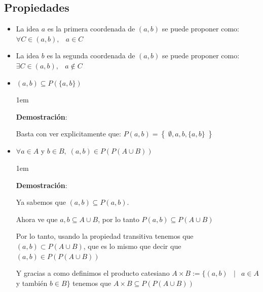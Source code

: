 \documentclass[12pt, fleqn]{report}                             %
\newenvironment{SmallIndentation}[1][0.75em]                    %
        {\begin{adjustwidth}{#1}{}\begin{footnotesize}}             %
        {\end{footnotesize}\end{adjustwidth}}                       %
\DeclareMathOperator \Space     {\quad}                         %
\DeclareMathOperator \MiniSpace {\;}                            %
\newcommand \Such           {\MiniSpace | \MiniSpace}           %
\theoremstyle{break}                                            %
\newcommand{\Set}[1]            {\left\{ \; #1 \; \right\}}     %
\begin{document}
                    \subsection*{Propiedades}
                    \begin{itemize}
                        \item La idea $a$ es la primera coordenada de $(a, b)$ se puede
                            proponer como: $\forall C \in (a, b), \MiniSpace a \in C$
                        
                        \item La idea $b$ es la segunda coordenada de $(a, b)$ se puede
                            proponer como: $\exists C \in (a, b), \MiniSpace a \notin C$
                        
                        \item $(a,b) \subseteq P(\{a,b\})$

                            \begin{SmallIndentation}[1em]
                                \textbf{Demostración}:

                                Basta con ver explicitamente que:
                                $P({a,b}) = \Set{\emptyset, a, b, \{a, b\}}$

                            \end{SmallIndentation}


                        \item $\forall a \in A$ y $b \in B, \; (a,b) \in P(P(A \cup B))$

                            \begin{SmallIndentation}[1em]
                                \textbf{Demostración}:

                                Ya sabemos que $(a,b) \subseteq P({a,b})$.

                                Ahora ve que ${a,b} \subseteq A \cup B$, por lo
                                tanto $P({a,b}) \subseteq P(A \cup B)$

                                Por lo tanto, usando la propiedad transitiva tenemos que
                                $(a,b) \subset P(A \cup B)$, que es lo mismo que decir
                                que $(a,b) \in P(P(A \cup B))$


                                Y gracias a como definimos el producto catesiano 
                                $A \times B := \{ (a, b) \Such a \in A$ y también $ b \in B \}$
                                tenemos que $A \times B \subseteq P(P(A \cup B))$

                            \end{SmallIndentation}



                    \end{itemize}
\end{document}
